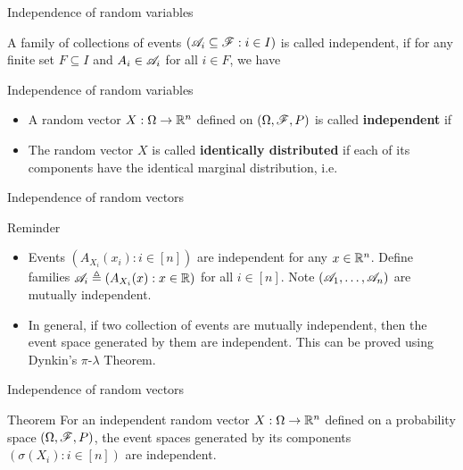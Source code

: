 \documentclass[12pt,aspectratio=169]{beamer}
\begin{document}
\begin{frame}{Independence of random variables}
\begin{Definition}
A family of collections of events $(\mathscr{A}_i \subseteq \mathscr{F}: i \in I)$ is called independent,
if for any finite set $F \subseteq I$ and $A_i \in \mathscr{A}_i$ for all $i \in F$, we have 
\end{Definition}
\end{frame}
\begin{frame}{Independence of random variables}
\begin{Definition}
\begin{itemize}
\item <1-> A random vector $X: \Omega \to \mathbb{R}^n$ defined on $(\Omega, \mathscr{F}, P)$ is called \textbf{independent} if 
\item <2-> The random vector $X$ is called \textbf{identically distributed} if each of its components have the identical marginal distribution, i.e.
\end{itemize}
\end{Definition}
\end{frame}
\begin{frame}{Independence of random vectors}
\begin{block}{Reminder}
\begin{itemize}
\item <1-> Events $(A_{X_i}(x_i): i \in [n])$ are independent for any $x \in \mathbb{R}^n$. 
Define families $\mathscr{A}_i \triangleq (A_{X_i}(x): x \in \mathbb{R})$ for all $i \in [n]$. Note $(\mathscr{A}_1, \dots, \mathscr{A}_n)$ are mutually independent. 
\item <2-> In general, if two collection of events are mutually independent, then the event space generated by them are independent. 
This can be proved using Dynkin's $\pi$-$\lambda$ Theorem. 
\end{itemize}
\end{block}
\end{frame}
\begin{frame}{Independence of random vectors}
\begin{block}{Theorem}
For an independent random vector $X: \Omega \to \mathbb{R}^n$ defined on a probability space $(\Omega, \mathscr{F}, P)$, 
the event spaces generated by its components $(\sigma(X_i): i \in [n])$ are independent.   
\end{block}
\end{frame}
\end{document}
